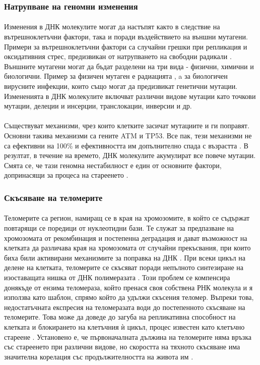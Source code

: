 \documentclass[pdftex,cyrillic,14pt,a4page,twoside]{extreport}
\begin{document}
\subsubsection{Натрупване на геномни изменения}
\paragraph{}
Изменения в ДНК молекулите могат да настъпят както в следствие на вътрешноклетъчни фактори, така и поради въздействието на външни мутагени. Примери за вътрешноклетъчни фактори са случайни грешки при репликация и оксидативния стрес, предизвикан от натрупването на свободни радикали \cite{wang1998}. Външните мутагени могат да бъдат разделени на три вида - физични, химични и биологични. Пример за физичен мутаген е радиацията \cite{breimer1988}, a за биологичен вирусните инфекции, които също могат да предизвикат генетични мутации. Измененията в ДНК молекулите включват различни видове мутации като точкови мутации, делеции и инсерции, транслокации, инверсии и др.\\\\
Съществуват механизми, чрез които клетките засичат мутациите и ги поправят. Основни такива механизми са гените ATM и TP53. Все пак, тези механизми не са ефективни на 100\% и ефективността им допълнително спада с възрастта \cite{auley2017}. В резултат, в течение на времето, ДНК молекулите акумулират все повече мутации. Смята се, че тази геномна нестабилност е един от основните фактори, допринасящи за процеса на стареенето \cite{vijg2013}.

\subsubsection{Скъсяване на теломерите}
\paragraph{}
Теломерите са регион, намиращ се в края на хромозомите, в който се съдържат повтарящи се поредици от нуклеотидни бази. Те служат за предпазване на хромозомата от рекомбинация и постепенна деградация и дават възможност на клетката да различава края на хромозомата от случайни прекъсвания, при които биха били активирани механизмите за поправка на ДНК \cite{griffith1999}. При всеки цикъл на делене на клетката, теломерите се скъсяват поради непълното синтезиране на изоставащата нишка от ДНК полимеразата \cite{koliada2015}. Този проблем се компенсира донякъде от ензима теломераза, който пренася своя собствена РНК молекула и я използва като шаблон, спрямо който да удължи скъсения теломер. Въпреки това, недостатъчната експресия на теломеразата води до постепенното скъсяване на теломерите. Това може да доведе до загуба на репликативна способност на клетката и блокирането на клетъчния ѝ цикъл, процес известен като клетъчно стареене \cite{muraki2012}. Установено е, че първоначалната дължина на теломерите няма връзка със стареенето при различни видове, но скоростта на тяхното скъсяване има значителна корелация със продължителността на живота им \cite{whittemore2019}.
\end{document}
